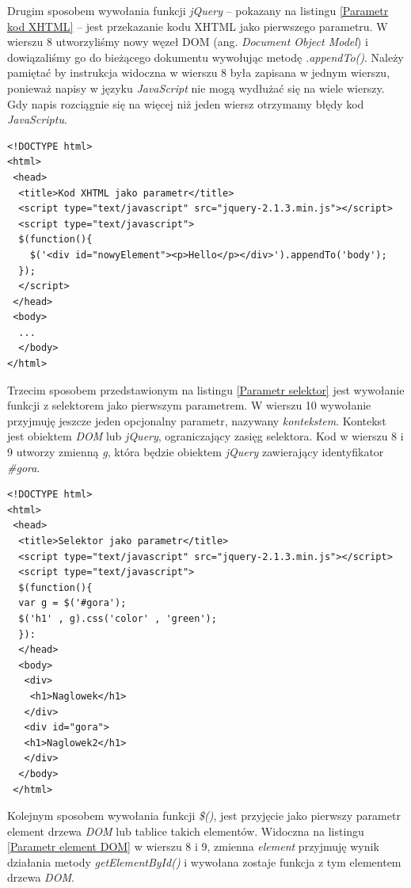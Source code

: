 \documentclass{iiuwb}
\begin{document}
Drugim sposobem wywołania funkcji \textit{jQuery} -- pokazany na listingu \ref{Parametr kod XHTML} -- jest przekazanie kodu XHTML jako pierwszego parametru. W wierszu 8 utworzyliśmy nowy węzeł DOM (ang. \textit{Document Object Model}) i dowiązaliśmy go do bieżącego dokumentu wywołując metodę \textit{.appendTo()}. Należy pamiętać by instrukcja widoczna w wierszu 8 była zapisana w jednym wierszu, ponieważ napisy w języku \textit{JavaScript} nie mogą wydłużać się na wiele wierszy. Gdy napis rozciągnie się na więcej niż jeden wiersz otrzymamy błędy kod \textit{JavaScriptu}.

\begin{lstlisting}[label=Parametr kod XHTML, caption=Wywołanie funkcji przyjmującej jako pierwszy parametr kod XHTML]
<!DOCTYPE html>
<html>
 <head>
  <title>Kod XHTML jako parametr</title>
  <script type="text/javascript" src="jquery-2.1.3.min.js"></script>
  <script type="text/javascript">
  $(function(){
  	$('<div id="nowyElement"><p>Hello</p></div>').appendTo('body');  
  });  
  </script>
 </head>
 <body>
  ...
  </body>
</html>
\end{lstlisting} 

Trzecim sposobem przedstawionym na listingu \ref{Parametr selektor} jest wywołanie funkcji z selektorem jako pierwszym parametrem. W wierszu 10 wywołanie przyjmuję jeszcze jeden opcjonalny parametr, nazywany \textit{kontekstem}. Kontekst jest obiektem \textit{DOM} lub \textit{jQuery}, ograniczający zasięg selektora. Kod w wierszu 8 i 9 utworzy zmienną \textit{g}, która będzie obiektem \textit{jQuery} zawierający identyfikator \textit{\#gora}.

\begin{lstlisting}[label=Parametr selektor, caption=Wywołanie funkcji przyjmującej jako parametr selektor]
<!DOCTYPE html>
<html>
 <head>
  <title>Selektor jako parametr</title>
  <script type="text/javascript" src="jquery-2.1.3.min.js"></script>
  <script type="text/javascript">
  $(function(){
  var g = $('#gora');
  $('h1' , g).css('color' , 'green');
  }):
  </head>
  <body>
   <div>
    <h1>Naglowek</h1>
   </div>
   <div id="gora">
   <h1>Naglowek2</h1>   
   </div>
  </body>
 </html>
\end{lstlisting}

Kolejnym sposobem wywołania funkcji \textit{\$()}, jest przyjęcie jako pierwszy parametr element drzewa \textit{DOM} lub tablice takich elementów. Widoczna na listingu \ref{Parametr element DOM} w wierszu 8 i 9, zmienna \textit{element} przyjmuję wynik działania metody \textit{getElementById()} i wywołana zostaje funkcja z tym elementem drzewa \textit{DOM}.
\end{document}
